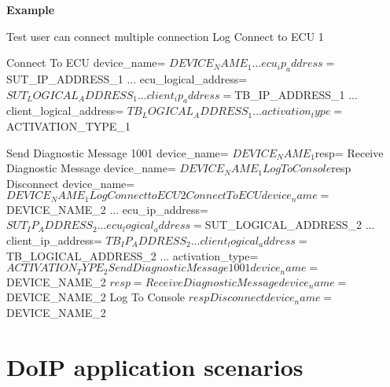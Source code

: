 \textbf{Example}
\begin{robotcode}
Test user can connect multiple connection
    Log    Connect to ECU 1

    Connect To ECU          device_name= ${DEVICE_NAME_1}
    ...                     ecu_ip_address= ${SUT_IP_ADDRESS_1}
    ...                     ecu_logical_address= ${SUT_LOGICAL_ADDRESS_1}
    ...                     client_ip_address= ${TB_IP_ADDRESS_1}
    ...                     client_logical_address= ${TB_LOGICAL_ADDRESS_1}
    ...                     activation_type= ${ACTIVATION_TYPE_1}

    Send Diagnostic Message    1001    device_name= ${DEVICE_NAME_1}
    ${resp}=    Receive Diagnostic Message    device_name= ${DEVICE_NAME_1}
    Log To Console    ${resp}
    Disconnect    device_name= ${DEVICE_NAME_1}

    Log    Connect to ECU 2
    Connect To ECU          device_name= ${DEVICE_NAME_2}
    ...                     ecu_ip_address= ${SUT_IP_ADDRESS_2}
    ...                     ecu_logical_address= ${SUT_LOGICAL_ADDRESS_2}
    ...                     client_ip_address= ${TB_IP_ADDRESS_2}
    ...                     client_logical_address= ${TB_LOGICAL_ADDRESS_2}
    ...                     activation_type= ${ACTIVATION_TYPE_2}

    Send Diagnostic Message    1001    device_name= ${DEVICE_NAME_2}
    ${resp}=    Receive Diagnostic Message    device_name= ${DEVICE_NAME_2}
    Log To Console    ${resp}
    Disconnect    device_name= ${DEVICE_NAME_2}
\end{robotcode}

\section{DoIP application scenarios}

